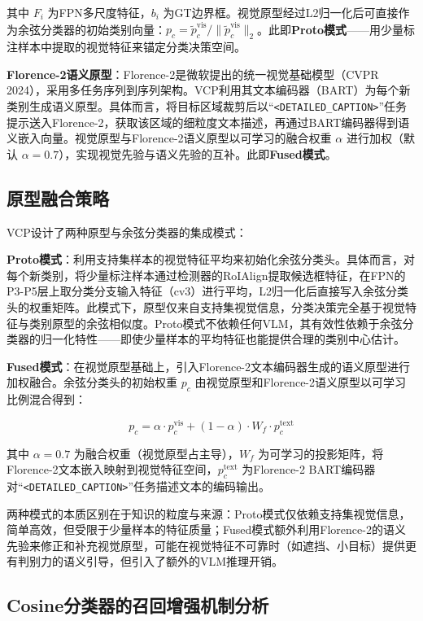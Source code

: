 \documentclass[zihao=5,a4paper,twocolumn]{ctexart}
\begin{document}
其中 $F_i$ 为FPN多尺度特征，$b_i$ 为GT边界框。视觉原型经过L2归一化后可直接作为余弦分类器的初始类别向量：$p_c = \tilde{p}_c^{\text{vis}} / \|\tilde{p}_c^{\text{vis}}\|_2$。此即\textbf{Proto模式}——用少量标注样本中提取的视觉特征来锚定分类决策空间。

\textbf{Florence-2语义原型}：Florence-2是微软提出的统一视觉基础模型（CVPR 2024），采用多任务序列到序列架构。VCP利用其文本编码器（BART）为每个新类别生成语义原型。具体而言，将目标区域裁剪后以``\texttt{<DETAILED\_CAPTION>}''任务提示送入Florence-2，获取该区域的细粒度文本描述，再通过BART编码器得到语义嵌入向量。视觉原型与Florence-2语义原型以可学习的融合权重 $\alpha$ 进行加权（默认 $\alpha=0.7$），实现视觉先验与语义先验的互补。此即\textbf{Fused模式}。

\subsection{原型融合策略}

VCP设计了两种原型与余弦分类器的集成模式：

\textbf{Proto模式}：利用支持集样本的视觉特征平均来初始化余弦分类头。具体而言，对每个新类别，将少量标注样本通过检测器的RoIAlign提取候选框特征，在FPN的P3-P5层上取分类分支输入特征（cv3）进行平均，L2归一化后直接写入余弦分类头的权重矩阵。此模式下，原型仅来自支持集视觉信息，分类决策完全基于视觉特征与类别原型的余弦相似度。Proto模式不依赖任何VLM，其有效性依赖于余弦分类器的归一化特性——即使少量样本的平均特征也能提供合理的类别中心估计。

\textbf{Fused模式}：在视觉原型基础上，引入Florence-2文本编码器生成的语义原型进行加权融合。余弦分类头的初始权重 $p_c$ 由视觉原型和Florence-2语义原型以可学习比例混合得到：

\begin{equation}
p_c = \alpha \cdot p_c^{\text{vis}} + (1 - \alpha) \cdot W_f \cdot p_c^{\text{text}}
\label{eq:fused}
\end{equation}

其中 $\alpha = 0.7$ 为融合权重（视觉原型占主导），$W_f$ 为可学习的投影矩阵，将Florence-2文本嵌入映射到视觉特征空间，$p_c^{\text{text}}$ 为Florence-2 BART编码器对``\texttt{<DETAILED\_CAPTION>}''任务描述文本的编码输出。

两种模式的本质区别在于知识的粒度与来源：Proto模式仅依赖支持集视觉信息，简单高效，但受限于少量样本的特征质量；Fused模式额外利用Florence-2的语义先验来修正和补充视觉原型，可能在视觉特征不可靠时（如遮挡、小目标）提供更有判别力的语义引导，但引入了额外的VLM推理开销。

\subsection{Cosine分类器的召回增强机制分析}
\end{document}
